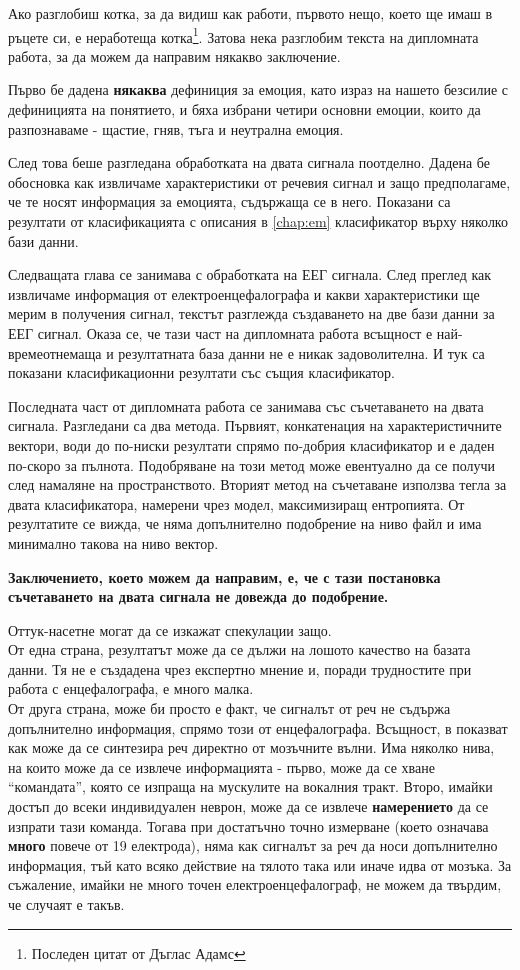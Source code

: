 \documentclass[main.tex]{subfiles}
\begin{document}
Ако разглобиш котка, за да видиш как работи, първото нещо, което ще имаш в ръцете си, е неработеща котка\footnote{Последен цитат от Дъглас Адамс}. Затова нека разглобим текста на дипломната работа, за да можем да направим някакво заключение.

Първо бе дадена \textbf{някаква} дефиниция за емоция, като израз на нашето безсилие с дефиницията на понятието, и бяха избрани четири основни емоции, които да разпознаваме - щастие, гняв, тъга и неутрална емоция.

След това беше разгледана обработката на двата сигнала поотделно. Дадена бе обосновка как извличаме характеристики от речевия сигнал и защо предполагаме, че те носят информация за емоцията, съдържаща се в него. Показани са резултати от класификацията с описания в \autoref{chap:em} класификатор върху няколко бази данни.

Следващата глава се занимава с обработката на ЕЕГ сигнала. След преглед как извличаме информация от електроенцефалографа и какви характеристики ще мерим в получения сигнал, текстът разглежда създаването на две бази данни за ЕЕГ сигнал. Оказа се, че тази част на дипломната работа всъщност е най-времеотнемаща и резултатната база данни не е никак задоволителна. И тук са показани класификационни резултати със същия класификатор.

Последната част от дипломната работа се занимава със съчетаването на двата сигнала. Разгледани са два метода. Първият, конкатенация на характеристичните вектори, води до по-ниски резултати спрямо по-добрия класификатор и е даден по-скоро за пълнота. Подобряване на този метод може евентуално да се получи след намаляне на пространството. Вторият метод на съчетаване използва тегла за двата класификатора, намерени чрез модел, максимизиращ ентропията. От резултатите се вижда, че няма допълнително подобрение на ниво файл и има минимално такова на ниво вектор. 

\textbf{Заключението, което можем да направим, е, че с тази постановка съчетаването на двата сигнала не довежда до подобрение.}

Оттук-насетне могат да се изкажат спекулации защо.\\
От една страна, резултатът може да се дължи на лошото качество на базата данни. Тя не е създадена чрез експертно мнение и, поради трудностите при работа с енцефалографа, е много малка.\\
От друга страна, може би просто е факт, че сигналът от реч не съдържа допълнително информация, спрямо този от енцефалографа. Всъщност, в \cite{synt} показват как може да се синтезира реч директно от мозъчните вълни. Има няколко нива, на които може да се извлече информацията - първо, може да се хване ``командата'', която се изпраща на мускулите на вокалния тракт. Второ, имайки достъп до всеки индивидуален неврон, може да се извлече \textbf{намерението} да се изпрати тази команда. Тогава при достатъчно точно измерване (което означава \textbf{много} повече от 19 електрода), няма как сигналът за реч да носи допълнително информация, тъй като всяко действие на тялото така или иначе идва от мозъка. За съжаление, имайки не много точен електроенцефалограф, не можем да твърдим, че случаят е такъв.
\end{document}
